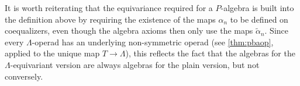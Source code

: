 %
%
%

\begin{rem}
It is worth reiterating that the equivariance required for a $P$-algebra is built into the definition above by requiring the existence of the maps $\alpha_{n}$ to be defined on coequalizers, even though the algebra axioms then only use the maps $\tilde{\alpha}_{n}$. Since every $\Lambda$-operad has an underlying non-symmetric operad (see \cref{thm:pbaop}, applied to the unique map $T \rightarrow \Lambda$), this reflects the fact that the algebras for the $\Lambda$-equivariant version are always algebras for the plain version, but not conversely.
\end{rem}

